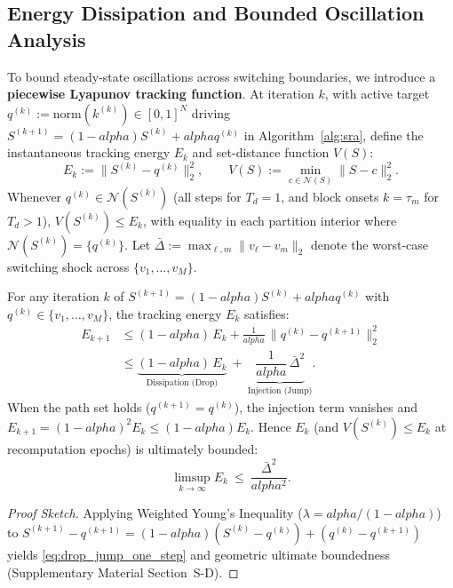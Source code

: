 \documentclass{ccjnl}
\newcommand{\rev}[1]{#1}
\def\rev#1{#1}%
\def\kappa{k}%
\def\alpha{alpha}%
\begin{document}
\subsection{Energy Dissipation and Bounded Oscillation Analysis}
\label{subsec:lyapunov}

To bound steady-state oscillations across switching boundaries, we introduce a \textbf{piecewise Lyapunov tracking function}.
\rev{At iteration $k$, with active target $q^{(k)} := \mathrm{norm}(\kappa^{(k)}) \in [0,1]^N$ driving $S^{(k+1)} = (1-\alpha)S^{(k)} + \alpha q^{(k)}$ in Algorithm~\ref{alg:sra}, define the instantaneous tracking energy $E_k$ and set-distance function $V(S)$:}
\begin{equation}\label{eq:lyapunov_def}
E_k := \|S^{(k)} - q^{(k)}\|_2^2, \qquad V(S) := \min_{c\in\mathcal N(S)}\|S-c\|_2^2.
\end{equation}
\rev{Whenever $q^{(k)} \in \mathcal{N}(S^{(k)})$ (all steps for $T_d=1$, and block onsets $k=\tau_m$ for $T_d>1$), $V(S^{(k)}) \le E_k$, with equality in each partition interior where $\mathcal{N}(S^{(k)}) = \{q^{(k)}\}$.}
Let $\bar{\Delta} := \max_{\ell, m} \|v_\ell - v_m\|_2$ denote the worst-case switching shock across $\{v_1, \dots, v_M\}$.

\begin{theorem}
\label{thm:drop_jump}
\rev{For any iteration $k$ of $S^{(k+1)} = (1-\alpha)S^{(k)} + \alpha q^{(k)}$ with $q^{(k)} \in \{v_1, \dots, v_M\}$, the tracking energy $E_k$ satisfies:
\begin{equation}\label{eq:drop_jump_one_step}
\begin{aligned}
E_{k+1} &\le (1-\alpha)\,E_k + \frac{1}{\alpha}\,\|q^{(k)} - q^{(k+1)}\|_2^2 \\
&\le \underbrace{(1-\alpha)\,E_k}_{\text{Dissipation (Drop)}}\ +\ \underbrace{\dfrac{1}{\alpha}\,\bar\Delta^{2}}_{\text{Injection (Jump)}}.
\end{aligned}
\end{equation}
When the path set holds ($q^{(k+1)} = q^{(k)}$), the injection term vanishes and $E_{k+1} = (1-\alpha)^2 E_k \le (1-\alpha) E_k$. Hence $E_k$ (and $V(S^{(k)}) \le E_k$ at recomputation epochs) is ultimately bounded:}
\begin{equation}\label{eq:limsup_boundedness}
\rev{\limsup_{k\to\infty} E_k\ \le\ \frac{\bar\Delta^{2}}{\alpha^2}.}
\end{equation}
\end{theorem}
\begin{proof}[Proof Sketch]
Applying Weighted Young's Inequality ($\lambda = \alpha/(1-\alpha)$) to $S^{(k+1)} - q^{(k+1)} = (1-\alpha)(S^{(k)} - q^{(k)}) + (q^{(k)} - q^{(k+1)})$ yields \eqref{eq:drop_jump_one_step} and geometric ultimate boundedness (Supplementary Material Section~S-D).
\end{proof}
\end{document}
